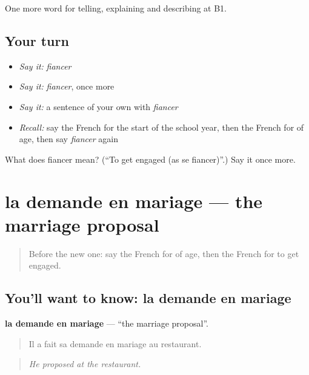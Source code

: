 \begin{grammarlens}[title={What you've built}]
One more word for telling, explaining and describing at B1.
\end{grammarlens}

\subsection*{Your turn}
\begin{itemize}
\raggedright
  \item \emph{Say it:} \emph{fiancer}
  \item \emph{Say it:} \emph{fiancer}, once more
  \item \emph{Say it:} a sentence of your own with \emph{fiancer}
  \item \emph{Recall:} say the French for the start of the school year, then the French for of age, then say \emph{fiancer} again
\end{itemize}

\begin{tcolorbox}[breakable,colback=teal!4,colframe=teal!35!black,title={Before you move on}]
What does fiancer mean? (\textquotedblleft{}To get engaged (as se fiancer)\textquotedblright{}.) Say it once more.
\end{tcolorbox}
\section[la demande en mariage]{la demande en mariage — the marriage proposal}

\label{lesson:FR-C311-demande-en-mariage}



\begin{quote}
Before the new one: say the French for of age, then the French for to get engaged.
\end{quote}

\subsection*{You'll want to know: la demande en mariage}
\textbf{la demande en mariage} — \textquotedblleft{}the marriage proposal\textquotedblright{}.

\begin{quote}
Il a fait sa demande en mariage au restaurant.
\end{quote}

\begin{quote}
\emph{He proposed at the restaurant.}
\end{quote}

